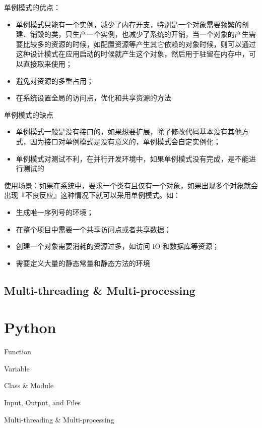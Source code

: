\documentclass[cn,10pt,math=newtx,citestyle=gb7714-2015,bibstyle=gb7714-2015]{elegantbook}
\begin{document}
单例模式的优点：
\begin{itemize}
  \item 单例模式只能有一个实例，减少了内存开支，特别是一个对象需要频繁的创建、销毁的类，只生产一个实例，也减少了系统的开销，当一个对象的产生需要比较多的资源的时候，如配置资源等产生其它依赖的对象时候，则可以通过这种设计模式在应用启动的时候就产生这个对象，然后用于驻留在内存中，可以直接取来使用；
  \item 避免对资源的多重占用；
  \item 在系统设置全局的访问点，优化和共享资源的方法\\
\end{itemize}


单例模式的缺点
\begin{itemize}
  \item 单例模式一般是没有接口的，如果想要扩展，除了修改代码基本没有其他方式，因为接口对单例模式是没有意义的，单例模式会自定实例化；
  \item 单例模式对测试不利，在并行开发环境中，如果单例模式没有完成，是不能进行测试的\\
\end{itemize}


使用场景：如果在系统中，要求一个类有且仅有一个对象，如果出现多个对象就会出现『不良反应』这种情况下就可以采用单例模式。如：

\begin{itemize}
  \item 生成唯一序列号的环境；
  \item 在整个项目中需要一个共享访问点或者共享数据；
  \item 创建一个对象需要消耗的资源过多，如访问 IO 和数据库等资源；
  \item 需要定义大量的静态常量和静态方法的环境
\end{itemize}


\subsection{Multi-threading \& Multi-processing}

\newpage


\section{Python}

\begin{introduction}
\item Function
\item Variable
\item Class \& Module
\item Input, Output, and Files
\item Multi-threading \& Multi-processing
\end{introduction}
\end{document}

